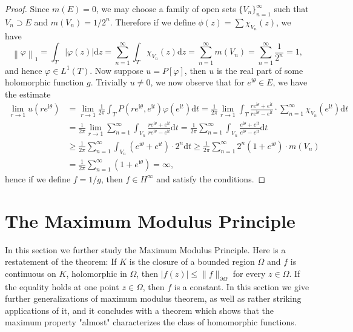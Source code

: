\begin{proof}
Since $m(E)=0$, we may choose a family of open sets $\{V_n\}_{n=1}^\infty$ such that $V_n\supset E$ and $m(V_n)=1/2^n$. Therefore if we define $\phi(z)=\sum\chi_{V_n}(z)$, we have 
$$
\left\| \varphi \right\| _1=\int_T{\left| \varphi \left( z \right) \right|\mathrm{d}z}=\sum_{n=1}^{\infty}{\int_T{\chi _{V_n}\left( z \right) \mathrm{d}z}}=\sum_{n=1}^{\infty}{m\left( V_n \right)}=\sum_{n=1}^{\infty}{\frac{1}{2^n}}=1,
$$
and hence $\varphi\in L^1(T)$. Now suppose $u=P[\varphi]$, then $u$ is the real part of some holomorphic function $g$. Trivially $u\ne 0$, we now observe that for $e^{\mathrm{i}\theta}\in E$, we have the estimate 
$$
\begin{aligned}
\lim_{r\rightarrow 1} u\left( re^{\mathrm{i}\theta} \right) &=\lim_{r\rightarrow 1} \frac{1}{2\pi}\int_T{P\left( re^{\mathrm{i}\theta},e^{\mathrm{i}t} \right) \varphi \left( e^{\mathrm{i}t} \right) \mathrm{d}t}=\frac{1}{2\pi}\lim_{r\rightarrow 1} \int_T{\frac{re^{\mathrm{i}\theta}+e^{\mathrm{i}t}}{re^{\mathrm{i}\theta}-e^{\mathrm{i}t}}\cdot \sum_{n=1}^{\infty}{\chi _{V_n}\left( e^{\mathrm{i}t} \right)}\mathrm{d}t}
\\
&=\frac{1}{2\pi}\lim_{r\rightarrow 1} \sum_{n=1}^{\infty}{\int_{V_n}{\frac{re^{\mathrm{i}\theta}+e^{\mathrm{i}t}}{re^{\mathrm{i}\theta}-e^{\mathrm{i}t}}\mathrm{d}t}}=\frac{1}{2\pi}\sum_{n=1}^{\infty}{\int_{V_n}{\frac{e^{\mathrm{i}\theta}+e^{\mathrm{i}t}}{e^{\mathrm{i}\theta}-e^{\mathrm{i}t}}}\mathrm{d}t}
\\
&\ge \frac{1}{2\pi}\sum_{n=1}^{\infty}{\int_{V_n}{\left( e^{\mathrm{i}\theta}+e^{\mathrm{i}t} \right) \cdot 2^n\mathrm{d}t}}\ge \frac{1}{2\pi}\sum_{n=1}^{\infty}{2^n\left( 1+e^{\mathrm{i}\theta} \right) \cdot m\left( V_n \right)}
\\
&=\frac{1}{2\pi}\sum_{n=1}^{\infty}{\left( 1+e^{\mathrm{i}\theta} \right)}=\infty ,
\end{aligned}
$$
hence if we define $f=1/g$, then $f\in H^\infty$ and satisfy the conditions.
\end{proof}
\newpage
\section{The Maximum Modulus Principle}
In this section we further study the Maximum Modulus Principle. Here is a restatement of the theorem: If $K$ is the closure of a bounded region $\Omega$ and $f$ is continuous on $K$, holomorphic in $\Omega$, then $|f(z)|\le\|f\|_{\partial\Omega}$ for every $z\in\Omega$. If the equality holds at one point $z\in\Omega$, then $f$ is a constant. In this section we give further generalizations of maximum modulus theorem, as well as rather striking applications of it, and it concludes with a theorem which shows that the maximum property "almost" characterizes the class of homomorphic functions.
